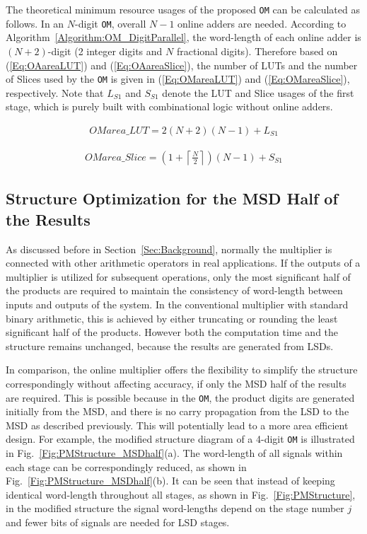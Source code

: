 \documentclass[conference]{IEEEtran}
\begin{document}
The theoretical minimum resource usages of the proposed \texttt{OM} can be calculated as follows. In an $N$-digit \texttt{OM}, overall $N-1$ online adders are needed. According to Algorithm~\ref{Algorithm:OM_DigitParallel}, the word-length of each online adder is $(N+2)$-digit (2 integer digits and $N$ fractional digits). Therefore based on (\ref{Eq:OAareaLUT}) and (\ref{Eq:OAareaSlice}), the number of LUTs and the number of Slices used by the \texttt{OM} is given in (\ref{Eq:OMareaLUT}) and (\ref{Eq:OMareaSlice}), respectively. Note that $L_{S1}$ and $S_{S1}$ denote the LUT and Slice usages of the first stage, which is purely built with combinational logic without online adders.

\begin{eqnarray}\label{Eq:OMareaLUT}
	OMarea\_{LUT} = 2(N+2)(N-1) + {L}_{S1}
\end{eqnarray}

\begin{eqnarray}\label{Eq:OMareaSlice}
	OMarea\_{Slice} = (1+\left\lceil{\frac{N}{2}}\right\rceil)(N-1)+S_{S1}
\end{eqnarray}

\subsection{Structure Optimization for the MSD Half of the Results}
As discussed before in Section~\ref{Sec:Background}, normally the multiplier is connected with other arithmetic operators in real applications. If the outputs of a multiplier is utilized for subsequent operations, only the most significant half of the products are required to maintain the consistency of word-length between inputs and outputs of the system. In the conventional multiplier with standard binary arithmetic, this is achieved by either truncating or rounding the least significant half of the products. However both the computation time and the structure remains unchanged, because the results are generated from LSDs.

In comparison, the online multiplier offers the flexibility to simplify the structure correspondingly without affecting accuracy, if only the MSD half of the results are required. This is possible because in the \texttt{OM}, the product digits are generated initially from the MSD, and there is no carry propagation from the LSD to the MSD as described previously. This will potentially lead to a more area efficient design. For example, the modified structure diagram of a 4-digit \texttt{OM} is illustrated in Fig.~\ref{Fig:PMStructure_MSDhalf}(a). The word-length of all signals within each stage can be correspondingly reduced, as shown in Fig.~\ref{Fig:PMStructure_MSDhalf}(b). It can be seen that instead of keeping identical word-length throughout all stages, as shown in Fig.~\ref{Fig:PMStructure}, in the modified structure the signal word-lengths depend on the stage number $j$ and fewer bits of signals are needed for LSD stages.
\end{document}
